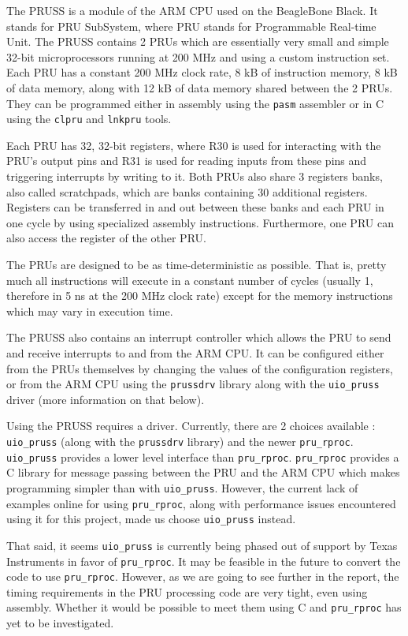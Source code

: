 \documentclass[]{report}
\begin{document}
The PRUSS is a module of the ARM CPU used on the BeagleBone Black. It
stands for PRU SubSystem, where PRU stands for Programmable Real-time
Unit. The PRUSS contains 2 PRUs which are essentially very small and
simple 32-bit microprocessors running at 200 MHz and using a custom
instruction set. Each PRU has a constant 200 MHz clock rate, 8 kB of
instruction memory, 8 kB of data memory, along with 12 kB of data memory
shared between the 2 PRUs. They can be programmed either in assembly
using the \texttt{pasm} assembler or in C using the \texttt{clpru} and
\texttt{lnkpru} tools.

Each PRU has 32, 32-bit registers, where R30 is used for interacting
with the PRU's output pins and R31 is used for reading inputs from these
pins and triggering interrupts by writing to it. Both PRUs also share 3
registers banks, also called scratchpads, which are banks containing 30
additional registers. Registers can be transferred in and out between
these banks and each PRU in one cycle by using specialized assembly
instructions. Furthermore, one PRU can also access the register of the
other PRU.

The PRUs are designed to be as time-deterministic as possible. That is,
pretty much all instructions will execute in a constant number of cycles
(usually 1, therefore in 5 ns at the 200 MHz clock rate) except for the
memory instructions which may vary in execution time.

The PRUSS also contains an interrupt controller which allows the PRU to
send and receive interrupts to and from the ARM CPU. It can be
configured either from the PRUs themselves by changing the values of the
configuration registers, or from the ARM CPU using the \texttt{prussdrv}
library along with the \texttt{uio\_pruss} driver (more information on
that below).

Using the PRUSS requires a driver. Currently, there are 2 choices
available : \texttt{uio\_pruss} (along with the \texttt{prussdrv}
library) and the newer \texttt{pru\_rproc}. \texttt{uio\_pruss} provides
a lower level interface than \texttt{pru\_rproc}. \texttt{pru\_rproc}
provides a C library for message passing between the PRU and the ARM CPU
which makes programming simpler than with \texttt{uio\_pruss}. However,
the current lack of examples online for using \texttt{pru\_rproc}, along
with performance issues encountered using it for this project, made us
choose \texttt{uio\_pruss} instead.

That said, it seems \texttt{uio\_pruss} is currently being phased out of
support by Texas Instruments in favor of \texttt{pru\_rproc}. It may be
feasible in the future to convert the code to use \texttt{pru\_rproc}.
However, as we are going to see further in the report, the timing
requirements in the PRU processing code are very tight, even using
assembly. Whether it would be possible to meet them using C and
\texttt{pru\_rproc} has yet to be investigated.
\end{document}
